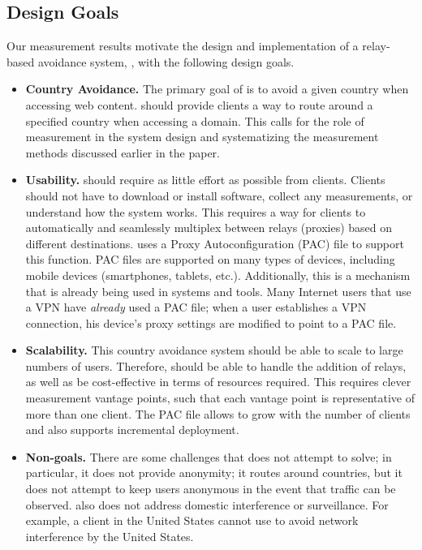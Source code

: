 \subsection{Design Goals}
\label{goals}

Our measurement results motivate 
 the design and implementation of a relay-based avoidance system,
\system{}, with the following design goals.

\begin{itemize}
\item {\bf Country Avoidance.}  The primary goal of \system{} is to
avoid a given country when accessing web content.  \system{} should
provide clients a way to route around a specified country when
accessing a domain.  This calls for the role of measurement in the
system design and systematizing the measurement methods discussed
earlier in the paper.

\item {\bf Usability.} \system{} should require as little effort as
possible from clients.  Clients should not have to download
or install software, collect any measurements, or understand how the
system works.  This requires a way for clients to automatically and
seamlessly multiplex between relays (proxies) based on different
destinations.  \system{} uses a Proxy Autoconfiguration (PAC) file to support this
function.  PAC files are supported on many types of devices, including mobile 
devices (smartphones, tablets, etc.).  Additionally, this is a mechanism that 
is already being used in systems and tools.  Many Internet users that 
use a VPN have {\it already} used a PAC file; when a user establishes a VPN connection, his 
device's proxy settings are modified to point to a PAC file.  

\item {\bf Scalability.}  This country avoidance system should be able to scale to 
large numbers of users.  Therefore, \system{} should be able to handle the addition
 of relays, as well as be cost-effective in terms of resources required. This requires 
clever measurement vantage points, such that each vantage point is representative of 
more than one client.  The PAC file allows \system{} to 
grow with the number of clients and also supports incremental deployment.

\item {\bf Non-goals.}  There are some challenges that \system{} does not
attempt to  solve; in particular, it does not provide anonymity; it routes
around  countries,
but it does not attempt to keep users anonymous in the event that traffic can
be observed.   \system{} also does not address domestic interference or surveillance. For
example, a client in the United States cannot use \system{} to avoid network interference 
by the United States. 
\end{itemize}

